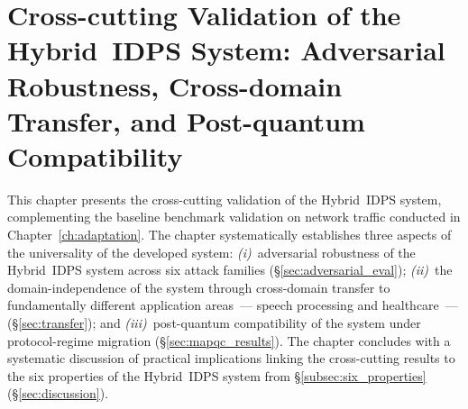 
\chapter{Cross-cutting Validation of the Hybrid~IDPS System: Adversarial Robustness, Cross-domain Transfer, and Post-quantum Compatibility}
\label{ch:experiments}

This chapter presents the cross-cutting validation of the
Hybrid~IDPS system, complementing the baseline benchmark validation
on network traffic conducted in Chapter~\ref{ch:adaptation}. The
chapter systematically establishes three aspects of the
universality of the developed system: \emph{(i)}~adversarial
robustness of the Hybrid~IDPS system across six attack families
(\S\ref{sec:adversarial_eval}); \emph{(ii)}~the domain-independence
of the system through cross-domain transfer to fundamentally
different application areas~--- speech processing and
healthcare~--- (\S\ref{sec:transfer}); and
\emph{(iii)}~post-quantum compatibility of the system under
protocol-regime migration (\S\ref{sec:mapqc_results}). The
chapter concludes with a systematic discussion of practical
implications linking the cross-cutting results to the six
properties of the Hybrid~IDPS system from
\S\ref{subsec:six_properties} (\S\ref{sec:discussion}).

